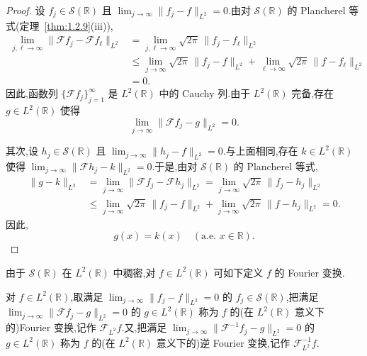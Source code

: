 \begin{proof}
设 $f_{j} \in \mathcal{S}(\mathbb{R})$ 且 $\lim_{j \to \infty}\|f_{j} - f\|_{L^{2}} = 0$.由对 $\mathcal{S}(\mathbb{R})$ 的 Plancherel 等式(定理~\ref{thm:1.2.9}(iii)),
\begin{align*}
\lim_{j, \ell \to \infty}\|\mathcal{F}f_{j} - \mathcal{F}f_{\ell}\|_{L^{2}} & = \lim_{j, \ell \to \infty}\sqrt{2\pi}\,\|f_{j} - f_{\ell}\|_{L^{2}} \\
& \leq \lim_{j \to \infty}\sqrt{2\pi}\,\|f_{j} - f\|_{L^{2}} + \lim_{\ell \to \infty}\sqrt{2\pi}\,\|f - f_{\ell}\|_{L^{2}} \\
& = 0.
\end{align*}
因此,函数列 $\{\mathcal{F}f_{j}\}_{j=1}^{\infty}$ 是 $L^{2}(\mathbb{R})$ 中的 Cauchy 列.由于 $L^{2}(\mathbb{R})$ 完备,存在 $g \in L^{2}(\mathbb{R})$ 使得
\begin{equation*}
\lim_{j \to \infty}\|\mathcal{F}f_{j} - g\|_{L^{2}} = 0.
\end{equation*}

其次,设 $h_{j} \in \mathcal{S}(\mathbb{R})$ 且 $\lim_{j \to \infty}\|h_{j} - f\|_{L^{2}} = 0$.与上面相同,存在 $k \in L^{2}(\mathbb{R})$ 使得 $\lim_{j \to \infty}\|\mathcal{F}h_{j} - k\|_{L^{2}} = 0$.于是,由对 $\mathcal{S}(\mathbb{R})$ 的 Plancherel 等式,
\begin{align*}
\| g - k \|_{L^{2}} & = \lim_{j \to \infty}\|\mathcal{F}f_{j} - \mathcal{F}h_{j}\|_{L^{2}} = \lim_{j \to \infty}\sqrt{2\pi}\,\|f_{j} - h_{j}\|_{L^{2}} \\
& \leq \lim_{j \to \infty}\sqrt{2\pi}\,\|f_{j} - f\|_{L^{2}} + \lim_{j \to \infty}\sqrt{2\pi}\,\|f - h_{j}\|_{L^{2}} = 0.
\end{align*}
因此,
\begin{equation*}
g(x) = k(x) \quad (\text{a.e. } x \in \mathbb{R}).
\end{equation*}
\end{proof}

由于 $\mathcal{S}(\mathbb{R})$ 在 $L^{2}(\mathbb{R})$ 中稠密,对 $f \in L^{2}(\mathbb{R})$ 可如下定义 $f$ 的 Fourier 变换.

\begin{definition}\label{def:1.2.14}
对 $f \in L^{2}(\mathbb{R})$,取满足 $\lim_{j \to \infty}\|f_{j} - f\|_{L^{2}} = 0$ 的 $f_{j} \in \mathcal{S}(\mathbb{R})$,把满足 $\lim_{j \to \infty}\|\mathcal{F}f_{j} - g\|_{L^{2}} = 0$ 的 $g \in L^{2}(\mathbb{R})$ 称为 $f$ 的(在 $L^{2}(\mathbb{R})$ 意义下的)Fourier 变换,记作 $\mathcal{F}_{L^{2}}f$.又,把满足 $\lim_{j \to \infty}\|\mathcal{F}^{-1}f_{j} - g\|_{L^{2}} = 0$ 的 $g \in L^{2}(\mathbb{R})$ 称为 $f$ 的(在 $L^{2}(\mathbb{R})$ 意义下的)逆 Fourier 变换,记作 $\mathcal{F}_{L^{2}}^{-1}f$.
\end{definition}

